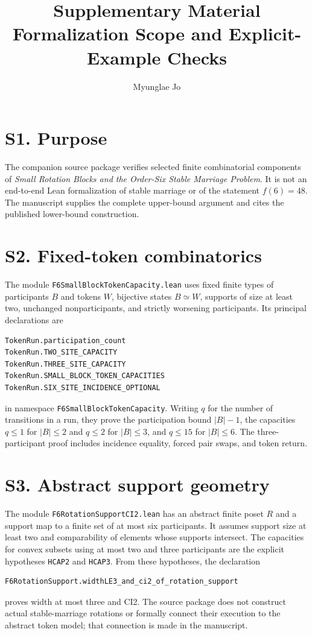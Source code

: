\documentclass[11pt]{article}
\title{Supplementary Material\\Formalization Scope and Explicit-Example Checks}
\author{Myunglae Jo}
\date{}
\begin{document}
\maketitle

\section*{S1. Purpose}
The companion source package verifies selected finite combinatorial components
of \emph{Small Rotation Blocks and the Order-Six Stable Marriage Problem}.
It is not an end-to-end Lean formalization of stable marriage or of the
statement $f(6)=48$.  The manuscript supplies the complete upper-bound argument
and cites the published lower-bound construction.

\section*{S2. Fixed-token combinatorics}
The module \texttt{F6SmallBlockTokenCapacity.lean} uses fixed finite types
of participants $B$ and tokens $W$, bijective states $B\simeq W$, supports
of size at least two, unchanged nonparticipants, and strictly worsening
participants.  Its principal declarations are
\begin{verbatim}
TokenRun.participation_count
TokenRun.TWO_SITE_CAPACITY
TokenRun.THREE_SITE_CAPACITY
TokenRun.SMALL_BLOCK_TOKEN_CAPACITIES
TokenRun.SIX_SITE_INCIDENCE_OPTIONAL
\end{verbatim}
in namespace \texttt{F6SmallBlockTokenCapacity}.  Writing $q$ for the number
of transitions in a run, they prove the participation bound $|B|-1$, the
capacities $q\le1$ for $|B|\le2$ and
$q\le2$ for $|B|\le3$, and $q\le15$ for $|B|\le6$.  The three-participant proof includes incidence
equality, forced pair swaps, and token return.

\section*{S3. Abstract support geometry}
The module \texttt{F6RotationSupportCI2.lean} has an abstract finite poset
$R$ and a support map to a finite set of at most six participants.  It assumes
support size at least two and comparability of elements whose supports
intersect.  The capacities for convex subsets using at most two and three
participants are the explicit hypotheses \texttt{HCAP2} and \texttt{HCAP3}.
From these hypotheses, the declaration
\begin{verbatim}
F6RotationSupport.widthLE3_and_ci2_of_rotation_support
\end{verbatim}
proves width at most three and CI2.  The source package does not construct actual
stable-marriage rotations or formally connect their execution to the abstract
token model; that connection is made in the manuscript.
\end{document}
